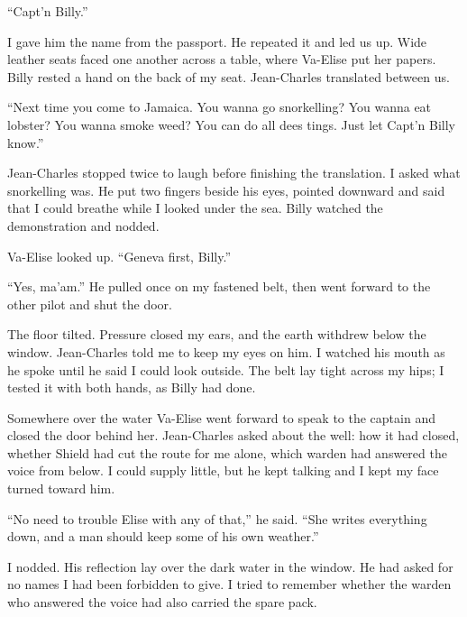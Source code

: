 ``Capt'n Billy.''\par

I gave him the name from the passport. He repeated it and led us up. Wide leather seats faced one another across a table, where Va-Elise put her papers. Billy rested a hand on the back of my seat. Jean-Charles translated between us.\par

``Next time you come to Jamaica. You wanna go snorkelling? You wanna eat lobster? You wanna smoke weed? You can do all dees tings. Just let Capt'n Billy know.''\par

Jean-Charles stopped twice to laugh before finishing the translation. I asked what snorkelling was. He put two fingers beside his eyes, pointed downward and said that I could breathe while I looked under the sea. Billy watched the demonstration and nodded.\par

Va-Elise looked up. ``Geneva first, Billy.''\par

``Yes, ma'am.'' He pulled once on my fastened belt, then went forward to the other pilot and shut the door.\par

The floor tilted. Pressure closed my ears, and the earth withdrew below the window. Jean-Charles told me to keep my eyes on him. I watched his mouth as he spoke until he said I could look outside. The belt lay tight across my hips; I tested it with both hands, as Billy had done.\par

Somewhere over the water Va-Elise went forward to speak to the captain and closed the door behind her. Jean-Charles asked about the well: how it had closed, whether Shield had cut the route for me alone, which warden had answered the voice from below. I could supply little, but he kept talking and I kept my face turned toward him.\par

``No need to trouble Elise with any of that,'' he said. ``She writes everything down, and a man should keep some of his own weather.''\par

I nodded. His reflection lay over the dark water in the window. He had asked for no names I had been forbidden to give. I tried to remember whether the warden who answered the voice had also carried the spare pack.\par

